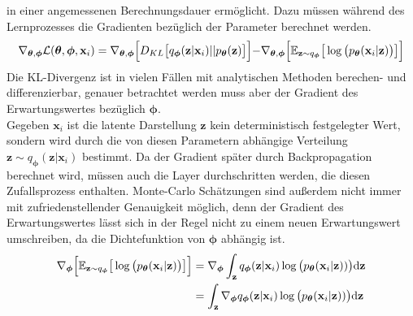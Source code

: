 \documentclass[12pt]{article}
\newcommand{\qenc}{q_{\boldsymbol\phi}(\mathbf{z}|\mathbf{x}_i)}
\newcommand{\pdec}{p_{\boldsymbol\theta}(\mathbf{x}_i|\mathbf{z})}
\newcommand{\z}{\mathbf{z}}
\newcommand{\x}{\mathbf{x}_i}
\begin{document}
	in einer angemessenen Berechnungsdauer ermöglicht. Dazu müssen während des Lernprozesses die Gradienten bezüglich der Parameter berechnet werden.
	\begin{align*}
	\nabla_{\boldsymbol\theta,\boldsymbol\phi} \mathcal{L}(\boldsymbol\theta,\boldsymbol\phi,\x) = \nabla_{\boldsymbol\theta,\boldsymbol\phi} \Bigl[D_{KL}\big[\qenc || p_{\boldsymbol\theta}(\textbf{z})\big]\Bigl]- \nabla_{\boldsymbol\theta,\boldsymbol\phi}\Bigl[\mathbb{E}_{\z\sim q_{\boldsymbol\phi}}\big[\log\big(\pdec\big)\big]\Bigl]
	\end{align*}
	Die KL-Divergenz ist in vielen Fällen mit analytischen Methoden berechen- und differenzierbar, genauer betrachtet werden muss aber der Gradient des Erwartungswertes bezüglich $\boldsymbol\phi$. \\
	Gegeben $\textbf{x}_{i}$ ist die latente Darstellung $\z$ kein deterministisch festgelegter Wert, sondern wird durch die von diesen Parametern abhängige Verteilung $\z \sim \qenc$ bestimmt. Da der Gradient später durch Backpropagation berechnet wird, müssen auch die Layer durchschritten werden, die diesen Zufallsprozess enthalten. Monte-Carlo Schätzungen sind außerdem nicht immer mit zufriedenstellender Genauigkeit möglich, denn der Gradient des Erwartungswertes lässt sich in der Regel nicht zu einem neuen Erwartungswert umschreiben, da die Dichtefunktion von $\boldsymbol\phi$ abhängig ist.
	\begin{align*}
	\nabla_{\boldsymbol\phi}\Bigl[\mathbb{E}_{\z\sim q_{\boldsymbol\phi}}\big[\log\big(\pdec\big)\big]\Bigl] &= \nabla_{\boldsymbol\phi} \int_{\textbf{z}}\qenc\log\big(\pdec)\big)\mathrm{d}\textbf{z} \notag \\
	&= \int_{\textbf{z}}\nabla_{\boldsymbol\phi}\qenc\log\big(\pdec)\big)\mathrm{d}\textbf{z}
	\end{align*}
\end{document}
